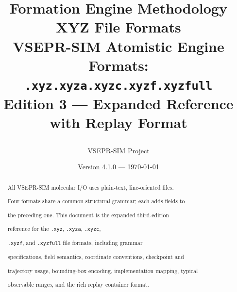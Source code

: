 \documentclass[12pt, a4paper, oneside]{article}
\title{%

  \textbf{Formation Engine Methodology}\\[6pt]

  \textbf{XYZ File Formats}\\[10pt]

  \large VSEPR-SIM Atomistic Engine\\

  Formats: \texttt{.xyz}\quad\texttt{.xyza}\quad\texttt{.xyzc}\quad\texttt{.xyzf}\quad\texttt{.xyzfull}\\[4pt]

  \normalsize Edition 3 --- Expanded Reference with Replay Format

}
\author{VSEPR-SIM Project}
\date{Version 4.1.0 --- \today}
\begin{document}
\maketitle


\begin{abstract}

All VSEPR-SIM molecular I/O uses plain-text, line-oriented files.

Four formats share a common structural grammar; each adds fields to

the preceding one.  This document is the expanded third-edition

reference for the \texttt{.xyz}, \texttt{.xyza}, \texttt{.xyzc},

\texttt{.xyzf}, and \texttt{.xyzfull} file formats, including grammar

specifications, field semantics, coordinate conventions, checkpoint and

trajectory usage, bounding-box encoding, implementation mapping, typical

observable ranges, and the rich replay container format.

\end{abstract}


\tableofcontents





\newpage

\thispagestyle{fancy}












\end{document}
